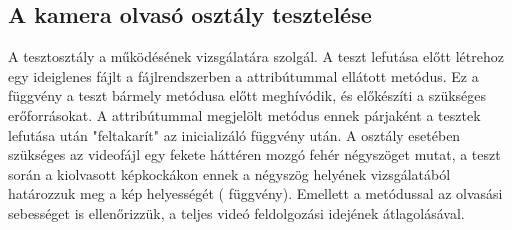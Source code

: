 \subsection{A kamera olvasó osztály tesztelése}
A tesztosztály a  működésének vizsgálatára szolgál. A teszt lefutása előtt létrehoz egy ideiglenes fájlt a fájlrendszerben a \code{[TestInitialize]} attribútummal ellátott metódus. Ez a függvény a teszt bármely metódusa előtt meghívódik, és előkészíti a szükséges erőforrásokat. A \code{[TestCleanup]} attribútummal megjelölt metódus ennek párjaként a tesztek lefutása után "feltakarít" az inicializáló függvény után. A  osztály esetében szükséges az videofájl egy fekete háttéren mozgó fehér négyszöget mutat, a teszt során a kiolvasott képkockákon ennek a négyszög helyének vizsgálatából határozzuk meg a kép helyességét ( függvény). Emellett a  metódussal az olvasási sebességet is ellenőrizzük, a teljes videó feldolgozási idejének átlagolásával.

